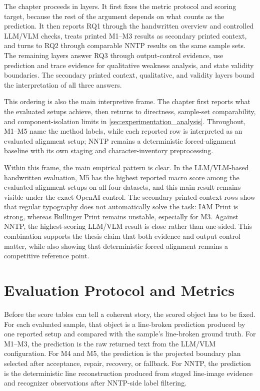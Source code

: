 The chapter proceeds in layers. It first fixes the metric protocol and scoring target, because the rest of the argument depends on what counts as the prediction. It then reports RQ1 through the handwritten overview and controlled LLM/VLM checks, treats printed M1--M3 results as secondary printed context, and turns to RQ2 through comparable NNTP results on the same sample sets. The remaining layers answer RQ3 through output-control evidence, use prediction and trace evidence for qualitative weakness analysis, and state validity boundaries. The secondary printed context, qualitative, and validity layers bound the interpretation of all three answers.

This ordering is also the main interpretive frame. The chapter first reports what the evaluated setups achieve, then returns to directness, sample-set comparability, and component-isolation limits in \autoref{sec:experimentation_analysis}. Throughout, M1--M5 name the method labels, while each reported row is interpreted as an evaluated alignment setup; NNTP remains a deterministic forced-alignment baseline with its own staging and character-inventory preprocessing.

Within this frame, the main empirical pattern is clear. In the LLM/VLM-based handwritten evaluation, M5 has the highest reported macro score among the evaluated alignment setups on all four datasets, and this main result remains visible under the exact OpenAI control. The secondary printed context rows show that regular typography does not automatically solve the task: IAM Print is strong, whereas Bullinger Print remains unstable, especially for M3. Against NNTP, the highest-scoring LLM/VLM result is close rather than one-sided. This combination supports the thesis claim that both evidence and output control matter, while also showing that deterministic forced alignment remains a competitive reference point.

\section{Evaluation Protocol and Metrics}
\label{sec:experimentation_protocol}

Before the score tables can tell a coherent story, the scored object has to be fixed. For each evaluated sample, that object is a line-broken prediction produced by one reported setup and compared with the sample's line-broken ground truth. For M1--M3, the prediction is the raw returned text from the LLM/VLM configuration. For M4 and M5, the prediction is the projected boundary plan selected after acceptance, repair, recovery, or fallback. For NNTP, the prediction is the deterministic line reconstruction produced from staged line-image evidence and recognizer observations after NNTP-side label filtering.

